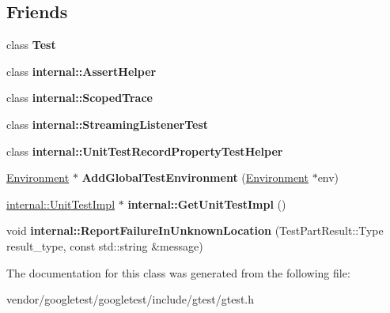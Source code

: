 \subsection*{Friends}
\begin{DoxyCompactItemize}
\item 
class {\bfseries Test}\hypertarget{classtesting_1_1UnitTest_a5b78b1c2e1fa07ffed92da365593eaa4}{}\label{classtesting_1_1UnitTest_a5b78b1c2e1fa07ffed92da365593eaa4}

\item 
class {\bfseries internal\+::\+Assert\+Helper}\hypertarget{classtesting_1_1UnitTest_a183151aa061362c87572e743fe233db1}{}\label{classtesting_1_1UnitTest_a183151aa061362c87572e743fe233db1}

\item 
class {\bfseries internal\+::\+Scoped\+Trace}\hypertarget{classtesting_1_1UnitTest_afa3927576c08d7b1e197ba16b2b3dcb7}{}\label{classtesting_1_1UnitTest_afa3927576c08d7b1e197ba16b2b3dcb7}

\item 
class {\bfseries internal\+::\+Streaming\+Listener\+Test}\hypertarget{classtesting_1_1UnitTest_adc037d188dab349a94868991955c9cd4}{}\label{classtesting_1_1UnitTest_adc037d188dab349a94868991955c9cd4}

\item 
class {\bfseries internal\+::\+Unit\+Test\+Record\+Property\+Test\+Helper}\hypertarget{classtesting_1_1UnitTest_ae970f89a9f477a349fe5778be85ef42e}{}\label{classtesting_1_1UnitTest_ae970f89a9f477a349fe5778be85ef42e}

\item 
\hyperlink{classtesting_1_1Environment}{Environment} $\ast$ {\bfseries Add\+Global\+Test\+Environment} (\hyperlink{classtesting_1_1Environment}{Environment} $\ast$env)\hypertarget{classtesting_1_1UnitTest_a5ec26e4c31220ff8e769cc09689a4d6d}{}\label{classtesting_1_1UnitTest_a5ec26e4c31220ff8e769cc09689a4d6d}

\item 
\hyperlink{classtesting_1_1internal_1_1UnitTestImpl}{internal\+::\+Unit\+Test\+Impl} $\ast$ {\bfseries internal\+::\+Get\+Unit\+Test\+Impl} ()\hypertarget{classtesting_1_1UnitTest_a56e56be7066957d612e53b5c60f6ac08}{}\label{classtesting_1_1UnitTest_a56e56be7066957d612e53b5c60f6ac08}

\item 
void {\bfseries internal\+::\+Report\+Failure\+In\+Unknown\+Location} (Test\+Part\+Result\+::\+Type result\+\_\+type, const std\+::string \&message)\hypertarget{classtesting_1_1UnitTest_a73f5a158c13793b90c80d854c9a75120}{}\label{classtesting_1_1UnitTest_a73f5a158c13793b90c80d854c9a75120}

\end{DoxyCompactItemize}


The documentation for this class was generated from the following file\+:\begin{DoxyCompactItemize}
\item 
vendor/googletest/googletest/include/gtest/gtest.\+h\end{DoxyCompactItemize}
